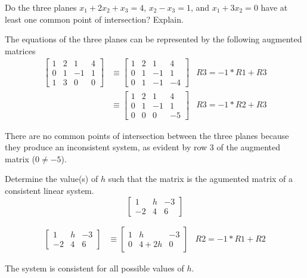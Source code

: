 \documentclass{mathhomework}
\begin{document}
\begin{problem}[1.1\#18]
    Do the three planes $x_1 + 2x_2 + x_3 = 4$, $x_2 - x_3 = 1$, and $x_1 + 3x_2 = 0$ have at least one common point of intersection? Explain.

    \begin{solution}
        The equations of the three planes can be represented by the following augmented matrices
        \begin{align*}
            \begin{bmatrix}
                1 & 2 & 1 & 4 \\
                0 & 1 & -1 & 1 \\
                1 & 3 & 0 & 0
            \end{bmatrix}
            & \equiv
            \begin{bmatrix}
                1 & 2 & 1 & 4 \\
                0 & 1 & -1 & 1 \\
                0 & 1 & -1 & -4
            \end{bmatrix}
            & R3 = -1 * R1 + R3 \\ & \equiv
            \begin{bmatrix}
                1 & 2 & 1 & 4 \\
                0 & 1 & -1 & 1 \\
                0 & 0 & 0 & -5
            \end{bmatrix}
            & R3 = -1 * R2 + R3
        \end{align*}

        There are no common points of intersection between the three planes because they produce an inconsistent system, as evident by row 3 of the augmented matrix ($0 \neq -5$).
    \end{solution}
\end{problem}

\pagebreak
\begin{problem}[1.1\#20]
    Determine the value(s) of $h$ such that the matrix is the agumented matrix of a consistent linear system.
    $$\begin{bmatrix}
        1 & h & -3 \\
        -2 & 4 & 6
    \end{bmatrix}$$

    \begin{solution}
        \begin{align*}
            \begin{bmatrix}
                1 & h & -3 \\
                -2 & 4 & 6
            \end{bmatrix}
            & \equiv
            \begin{bmatrix}
                1 & h & -3 \\
                0 & 4+2h & 0
            \end{bmatrix}
            & R2 = -1 * R1 + R2
        \end{align*}

        The system is consistent for all possible values of $h$.
    \end{solution}
\end{problem}
\end{document}
